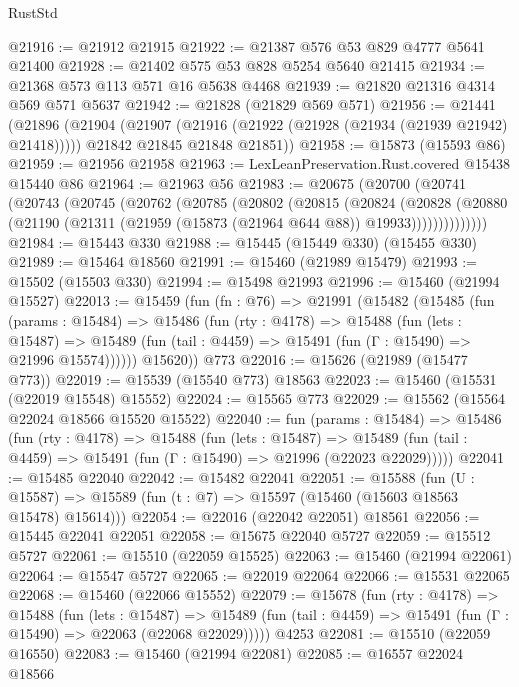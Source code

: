 \begin{lexlean}{RustStd}
\begin{coremodule}
@21916 := @21912 @21915
@21922 := @21387 @576 @53 @829 @4777 @5641 @21400
@21928 := @21402 @575 @53 @828 @5254 @5640 @21415
@21934 := @21368 @573 @113 @571 @16 @5638 @4468
@21939 := @21820 @21316 @4314 @569 @571 @5637
@21942 := @21828 (@21829 @569 @571)
@21956 := @21441
    (@21896
      (@21904
        (@21907 (@21916 (@21922 (@21928 (@21934 (@21939 @21942) @21418)))))
        @21842
        @21845
        @21848
        @21851))
@21958 := @15873 (@15593 @86)
@21959 := @21956 @21958
@21963 := LexLeanPreservation.Rust.covered @15438 @15440 @86
@21964 := @21963 @56
@21983 := @20675
    (@20700
      (@20741
        (@20743
          (@20745
            (@20762
              (@20785
                (@20802
                  (@20815
                    (@20824
                      (@20828
                        (@20880
                          (@21190 (@21311 (@21959 (@15873 (@21964 @644 @88)) @19933))))))))))))))
@21984 := @15443 @330
@21988 := @15445 (@15449 @330) (@15455 @330)
@21989 := @15464 @18560
@21991 := @15460 (@21989 @15479)
@21993 := @15502 (@15503 @330)
@21994 := @15498 @21993
@21996 := @15460 (@21994 @15527)
@22013 := @15459
    (fun (fn : @76) =>
    @21991
      (@15482
        (@15485
          (fun (params : @15484) =>
          @15486
            (fun (rty : @4178) =>
            @15488
              (fun (lets : @15487) =>
              @15489 (fun (tail : @4459) => @15491 (fun (Γ : @15490) => @21996 @15574))))))
        @15620))
    @773
@22016 := @15626 (@21989 (@15477 @773))
@22019 := @15539 (@15540 @773) @18563
@22023 := @15460 (@15531 (@22019 @15548) @15552)
@22024 := @15565 @773
@22029 := @15562 (@15564 @22024 @18566 @15520 @15522)
@22040 := fun (params : @15484) =>
  @15486
    (fun (rty : @4178) =>
    @15488
      (fun (lets : @15487) =>
      @15489 (fun (tail : @4459) => @15491 (fun (Γ : @15490) => @21996 (@22023 @22029)))))
@22041 := @15485 @22040
@22042 := @15482 @22041
@22051 := @15588
    (fun (U : @15587) => @15589 (fun (t : @7) => @15597 (@15460 (@15603 @18563 @15478) @15614)))
@22054 := @22016 (@22042 @22051) @18561
@22056 := @15445 @22041 @22051
@22058 := @15675 @22040 @5727
@22059 := @15512 @5727
@22061 := @15510 (@22059 @15525)
@22063 := @15460 (@21994 @22061)
@22064 := @15547 @5727
@22065 := @22019 @22064
@22066 := @15531 @22065
@22068 := @15460 (@22066 @15552)
@22079 := @15678
    (fun (rty : @4178) =>
    @15488
      (fun (lets : @15487) =>
      @15489 (fun (tail : @4459) => @15491 (fun (Γ : @15490) => @22063 (@22068 @22029)))))
    @4253
@22081 := @15510 (@22059 @16550)
@22083 := @15460 (@21994 @22081)
@22085 := @16557 @22024 @18566

\end{coremodule}
\end{lexlean}
